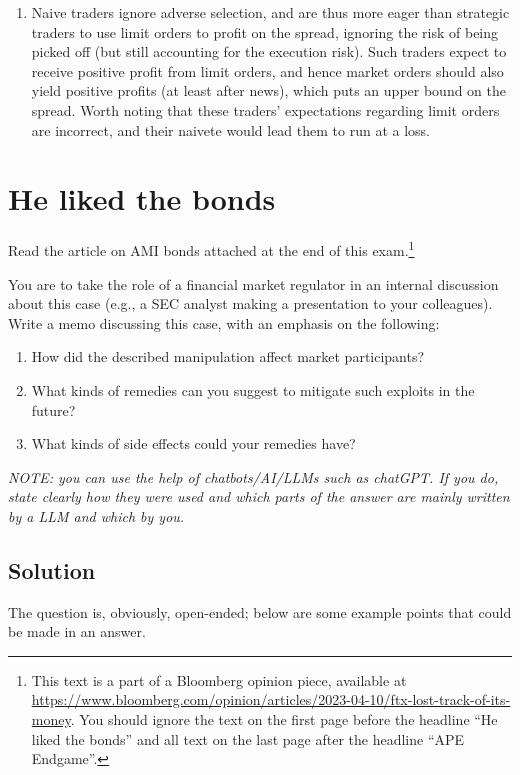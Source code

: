 \documentclass[a4paper]{article}
\newif\ifsolutions
\begin{document}
\begin{enumerate}
	\item Naive traders ignore adverse selection, and are thus more eager than strategic traders to use limit orders to profit on the spread, ignoring the risk of being picked off (but still accounting for the execution risk). Such traders expect to receive positive profit from limit orders, and hence market orders should also yield positive profits (at least after news), which puts an upper bound on the spread. Worth noting that these traders' expectations regarding limit orders are incorrect, and their naivete would lead them to run at a loss.
\end{enumerate}
\fi




\section{He liked the bonds}

Read the article on AMI bonds attached at the end of this exam.\footnote{This text is a part of a Bloomberg opinion piece, available at \url{https://www.bloomberg.com/opinion/articles/2023-04-10/ftx-lost-track-of-its-money}. You should ignore the text on the first page before the headline ``He liked the bonds'' and all text on the last page after the headline ``APE Endgame''.}

You are to take the role of a financial market regulator in an internal discussion about this case (e.g., a SEC analyst making a presentation to your colleagues). Write a memo discussing this case, with an emphasis on the following:
\begin{enumerate}
	\item How did the described manipulation affect market participants?
	\item What kinds of remedies can you suggest to mitigate such exploits in the future? 
	\item What kinds of side effects could your remedies have?
\end{enumerate}
\emph{NOTE: you can use the help of chatbots/AI/LLMs such as chatGPT. If you do, state clearly how they were used and which parts of the answer are mainly written by a LLM and which by you.}

\ifsolutions
\subsection*{Solution}
	The question is, obviously, open-ended; below are some example points that could be made in an answer.
\end{document}
